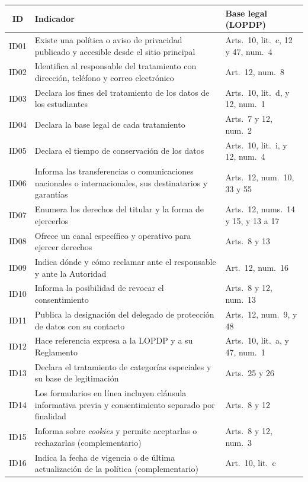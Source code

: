 \documentclass[11pt,a4paper]{article}
\begin{document}
{\small
\renewcommand{\arraystretch}{1.2}
\begin{tabularx}{\textwidth}{|c|L|>{\raggedright\arraybackslash}p{3.8cm}|}
  \hline
  \textbf{ID} & \textbf{Indicador} & \textbf{Base legal (LOPDP)} \\ \hline
  ID01 & Existe una política o aviso de privacidad publicado y accesible desde el sitio principal & Arts.~10, lit.~c, 12 y 47, num.~4 \\ \hline
  ID02 & Identifica al responsable del tratamiento con dirección, teléfono y correo electrónico & Art.~12, num.~8 \\ \hline
  ID03 & Declara los fines del tratamiento de los datos de los estudiantes & Arts.~10, lit.~d, y 12, num.~1 \\ \hline
  ID04 & Declara la base legal de cada tratamiento & Arts.~7 y 12, num.~2 \\ \hline
  ID05 & Declara el tiempo de conservación de los datos & Arts.~10, lit.~i, y 12, num.~4 \\ \hline
  ID06 & Informa las transferencias o comunicaciones nacionales o internacionales, sus destinatarios y garantías & Arts.~12, num.~10, 33 y 55 \\ \hline
  ID07 & Enumera los derechos del titular y la forma de ejercerlos & Arts.~12, nums.~14 y 15, y 13 a 17 \\ \hline
  ID08 & Ofrece un canal específico y operativo para ejercer derechos & Arts.~8 y 13 \\ \hline
  ID09 & Indica dónde y cómo reclamar ante el responsable y ante la Autoridad & Art.~12, num.~16 \\ \hline
  ID10 & Informa la posibilidad de revocar el consentimiento & Arts.~8 y 12, num.~13 \\ \hline
  ID11 & Publica la designación del delegado de protección de datos con su contacto & Arts.~12, num.~9, y 48 \\ \hline
  ID12 & Hace referencia expresa a la LOPDP y a su Reglamento & Arts.~10, lit.~a, y 47, num.~1 \\ \hline
  ID13 & Declara el tratamiento de categorías especiales y su base de legitimación & Arts.~25 y 26 \\ \hline
  ID14 & Los formularios en línea incluyen cláusula informativa previa y consentimiento separado por finalidad & Arts.~8 y 12 \\ \hline
  ID15 & Informa sobre \textit{cookies} y permite aceptarlas o rechazarlas (complementario) & Arts.~8 y 12, num.~3 \\ \hline
  ID16 & Indica la fecha de vigencia o de última actualización de la política (complementario) & Art.~10, lit.~c \\ \hline
\end{tabularx}
}
\end{document}
